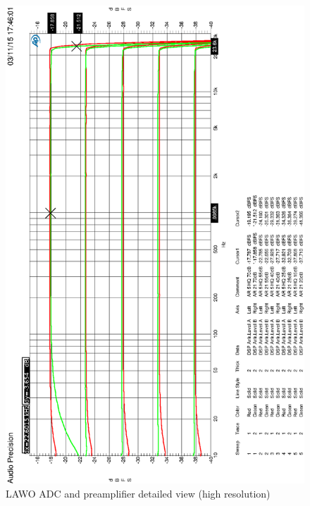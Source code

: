 \documentclass[11pt]{report}
\begin{document}
\begin{appendix}
\begin{figure}[htbp]
\begin{center}
\includegraphics[width=14cm,keepaspectratio=true]{HQLAWOVorverstaerker5u21dBVergleichszoom}
\caption{LAWO ADC and preamplifier detailed view (high resolution)}
\label{Abb.:1}
\end{center}
\end{figure}


\end{appendix}
\end{document}
